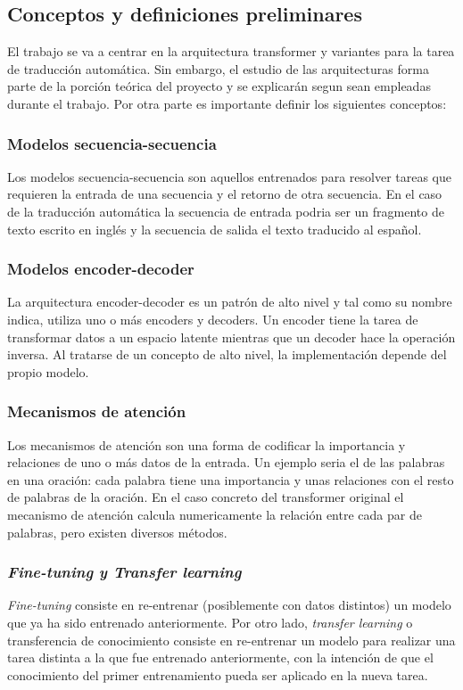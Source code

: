 \subsection{Conceptos y definiciones preliminares}
El trabajo se va a centrar en la arquitectura transformer \cite{Vaswani2017Jun} y variantes 
para la tarea de traducción automática. Sin embargo, el estudio de las arquitecturas
forma parte de la porción teórica del proyecto y se explicarán segun sean empleadas durante el trabajo.
Por otra parte es importante definir los siguientes conceptos:

\subsubsection*{Modelos secuencia-secuencia}
Los modelos secuencia-secuencia son aquellos entrenados para
resolver tareas que requieren la entrada de una secuencia y el retorno de
otra secuencia.
En el caso de la traducción automática la secuencia de entrada podria ser
un fragmento de texto escrito en inglés y la secuencia de salida el texto
traducido al español.

\subsubsection*{Modelos encoder-decoder}
La arquitectura encoder-decoder es un patrón de alto nivel y tal como su nombre indica,
utiliza uno o más encoders y decoders.
Un encoder tiene la tarea de transformar datos a un espacio latente
mientras que un decoder hace la operación inversa. Al tratarse de un concepto de alto nivel, la
implementación depende del propio modelo.

\subsubsection*{Mecanismos de atención}
Los mecanismos de atención son una forma de codificar la importancia y relaciones de uno o más
datos de la entrada. Un ejemplo seria el de las palabras en una oración: cada palabra tiene una
importancia y unas relaciones con el resto de palabras de la oración.
En el caso concreto del transformer original \cite{Vaswani2017Jun} el mecanismo de atención
calcula numericamente la relación entre cada par de palabras, pero existen diversos métodos.

\subsubsection*{\textit{Fine-tuning y Transfer learning}}
\textit{Fine-tuning} consiste en re-entrenar (posiblemente con datos distintos) un modelo que ya ha
sido entrenado anteriormente. Por otro lado, \textit{transfer learning} o transferencia de conocimiento
consiste en re-entrenar un modelo para realizar una tarea distinta a la que fue entrenado anteriormente,
con la intención de que el conocimiento del primer entrenamiento pueda ser aplicado en la nueva tarea.

